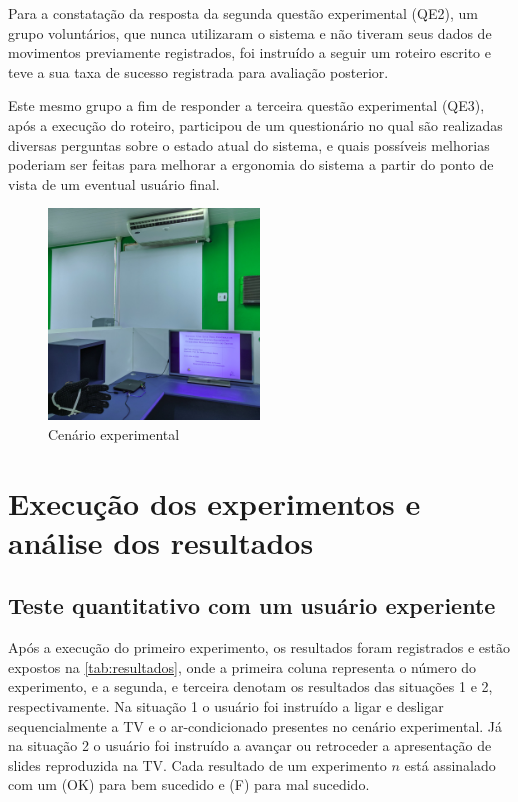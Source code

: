 Para a constatação da resposta da segunda questão experimental (QE2), um grupo voluntários, que nunca utilizaram o sistema e não tiveram seus dados de movimentos previamente registrados, foi instruído a seguir um roteiro escrito e teve a sua taxa de sucesso registrada para avaliação posterior. 

Este mesmo grupo a fim de responder a terceira questão experimental (QE3), após a execução do roteiro, participou de um questionário no qual são realizadas diversas perguntas sobre o estado atual do sistema, e quais possíveis melhorias poderiam ser feitas para melhorar a ergonomia do sistema a partir do ponto de vista de um eventual usuário final.

\begin{figure}[ht]
    \centering
    \includegraphics[width=0.5\textwidth, keepaspectratio]{resources/cenario.jpg}
    \caption{Cenário experimental}
    \label{fig:cenario}
\end{figure}



\section{Execução dos experimentos e análise dos resultados}

\subsection{Teste quantitativo com um usuário experiente}

Após a execução do primeiro experimento, os resultados foram registrados e estão expostos na \autoref{tab:resultados}, onde a primeira coluna representa o número do experimento, e a segunda, e terceira denotam os resultados das situações 1 e 2, respectivamente. Na situação 1 o usuário foi instruído a ligar e desligar sequencialmente a TV e o ar-condicionado presentes no cenário experimental. Já na situação 2 o usuário foi instruído a avançar ou retroceder a apresentação de slides reproduzida na TV. Cada resultado de um experimento $n$ está assinalado com um (OK) para bem sucedido e (F) para mal sucedido. 

